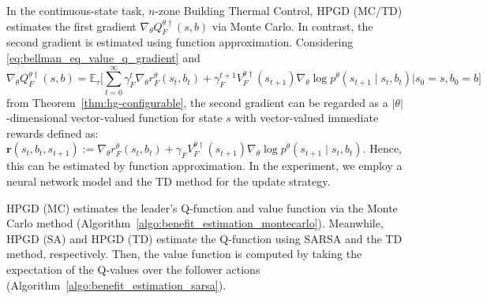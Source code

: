 \documentclass[letterpaper]{article} %
\providecommand{\E}{\mathbb{E}} %
\begin{document}
In the continuous-state task, $n$-zone Building Thermal Control, \textsc{HPGD (MC/TD)} estimates the first gradient $\nabla_{\theta}Q_F^{\theta\dagger}(s,b)$ via Monte Carlo. 
In contrast, the second gradient is estimated using function approximation.
Considering \eqref{eq:bellman_eq_value_q_gradient} and 
\begin{equation}
\nabla_{{\theta}}Q_F^{{\theta}\dag}(s,b) = \E_\tau\bigg[\sum_{t=0}^\infty\gamma_F^t\nabla_{{\theta}}r_F^{{\theta}}(s_t,b_t) 
+ \gamma_F^{t+1}V_F^{{\theta}\dag}(s_{t+1})\nabla_{{\theta}}\log p^{{\theta}}(s_{t+1}\mid s_t,b_t) \bigg|s_0=s,b_0=b\bigg]
\end{equation}
from Theorem~\ref{thm:hg-configurable}, the second gradient can be regarded as a $|\theta|$-dimensional vector-valued function for state $s$ with vector-valued immediate rewards defined as: $\bm{r}(s_t,b_t,s_{t+1}):=\nabla_{{\theta}}r_F^{{\theta}}(s_t,b_t) 
+ \gamma_F V_F^{{\theta}\dag}(s_{t+1})\nabla_{{\theta}}\log p^{{\theta}}(s_{t+1}\mid s_t,b_t)$.
Hence, this can be estimated by function approximation.
In the experiment, we employ a neural network model and the TD method for the update strategy.

\textsc{HPGD (MC)} estimates the leader’s Q-function and value function via the Monte Carlo method (Algorithm~\ref{algo:benefit_estimation_montecarlo}).  
Meanwhile, \textsc{HPGD (SA)} and \textsc{HPGD (TD)} estimate the Q-function using SARSA and the TD method, respectively.
Then, the value function is computed by taking the expectation of the Q-values over the follower actions (Algorithm~\ref{algo:benefit_estimation_sarsa}).
\end{document}
